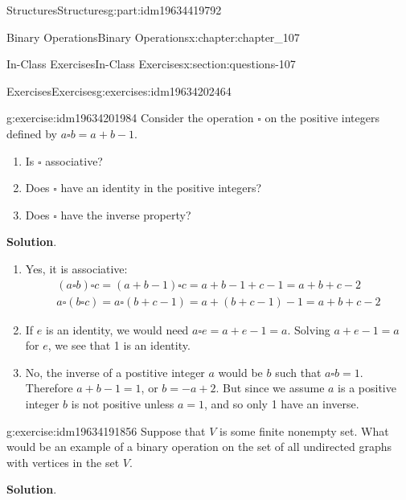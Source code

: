 \documentclass[oneside,10pt,]{book}
\newcommand{\blocktitlefont}{\relax}
\numberwithin{equation}{section}
\begin{document}
\begin{partptx}{Structures}{}{Structures}{}{}{g:part:idm19634419792}
\begin{chapterptx}{Binary Operations}{}{Binary Operations}{}{}{x:chapter:chapter_107}
\begin{sectionptx}{In-Class Exercises}{}{In-Class Exercises}{}{}{x:section:questions-107}
\begin{exercises-subsection-numberless}{Exercises}{}{Exercises}{}{}{g:exercises:idm19634202464}
\begin{exercisegroup}
\begin{divisionexerciseeg}{2}{}{}{g:exercise:idm19634201984}%
Consider the  operation \(\square\) on the positive integers defined by  \(a \square b  = a+b-1\).%
\begin{enumerate}[label=(\alph*)]
\item{}Is \(\square\) associative?%
\item{}Does  \(\square\) have an identity in the positive integers?%
\item{}Does  \(\square\) have the inverse property?%
\end{enumerate}
%
\par\smallskip%
\noindent\textbf{\blocktitlefont Solution}.\hypertarget{g:solution:idm19634199312}{}\quad{}%
\begin{enumerate}[label=(\alph*)]
\item{}Yes, it is associative:%
\begin{gather*}
(a \square b)\square c= (a+b-1)\square c = a+b-1+c-1 = a+b+c-2\\
a \square(b \square c)= a \square(b+c-1) = a+(b+c-1)-1 = a+b+c-2
\end{gather*}
%
\item{}If \(e\) is an identity,  we would need \(a \square e=a+e-1 = a.\)  Solving \(a+e-1 = a\) for \(e\), we see that 1 is an identity.%
\item{}No, the inverse of a postitive integer \(a\)  would be \(b\)   such that \(a \square b=1\).   Therefore \(a+b-1=1\), or \(b=-a+2\).  But since we assume \(a\) is a positive integer \(b\) is not positive unless \(a = 1\),  and so only 1 have an inverse.%
\end{enumerate}
%
\end{divisionexerciseeg}%
\begin{divisionexerciseeg}{3}{}{}{g:exercise:idm19634191856}%
Suppose that \(V\) is some finite nonempty set. What would be an example of a binary operation on the set of all undirected graphs with vertices in the set \(V\).%
\par\smallskip%
\noindent\textbf{\blocktitlefont Solution}.\hypertarget{g:solution:idm19634186880}{}\quad{}%
\end{divisionexerciseeg}%
\end{exercisegroup}
\par\medskip\noindent
\end{exercises-subsection-numberless}
\end{sectionptx}
\end{chapterptx}
%
\typeout{************************************************}

\end{partptx}
\end{document}
